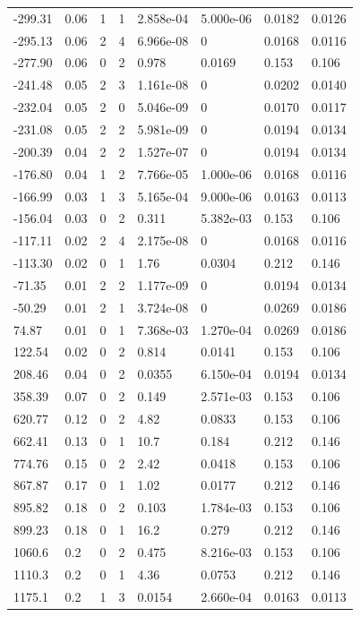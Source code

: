 \documentclass[preview]{standalone}
\begin{document}
{{\begin{tabular}{L{1.2cm}C{1.2cm} C{0.3cm}C{0.5cm} C{1.4cm}C{1.4cm} C{1.4cm}C{1.4cm}}
  -299.31  &  0.06  & 1     &  1 &  2.858e-04  & 5.000e-06  & 0.0182 &  0.0126   \\ 
  -295.13  &  0.06  & 2     &  4 &  6.966e-08  & 0  & 0.0168 &  0.0116   \\ 
  -277.90  &  0.06  & 0     &  2 &  0.978  & 0.0169  & 0.153 &  0.106   \\ 
  -241.48  &  0.05  & 2     &  3 &  1.161e-08  & 0  & 0.0202 &  0.0140   \\ 
  -232.04  &  0.05  & 2     &  0 &  5.046e-09  & 0  & 0.0170 &  0.0117   \\ 
  -231.08  &  0.05  & 2     &  2 &  5.981e-09  & 0  & 0.0194 &  0.0134   \\ 
  -200.39  &  0.04  & 2     &  2 &  1.527e-07  & 0  & 0.0194 &  0.0134   \\ 
  -176.80  &  0.04  & 1     &  2 &  7.766e-05  & 1.000e-06  & 0.0168 &  0.0116   \\ 
  -166.99  &  0.03  & 1     &  3 &  5.165e-04  & 9.000e-06  & 0.0163 &  0.0113   \\ 
  -156.04  &  0.03  & 0     &  2 &  0.311  & 5.382e-03  & 0.153 &  0.106   \\ 
  -117.11  &  0.02  & 2     &  4 &  2.175e-08  & 0  & 0.0168 &  0.0116   \\ 
  -113.30  &  0.02  & 0     &  1 &  1.76  & 0.0304  & 0.212 &  0.146   \\ 
  -71.35  &  0.01  & 2     &  2 &  1.177e-09  & 0  & 0.0194 &  0.0134   \\ 
  -50.29  &  0.01  & 2     &  1 &  3.724e-08  & 0  & 0.0269 &  0.0186   \\ 
  74.87  &  0.01  & 0     &  1 &  7.368e-03  & 1.270e-04  & 0.0269 &  0.0186   \\ 
  122.54  &  0.02  & 0     &  2 &  0.814  & 0.0141  & 0.153 &  0.106   \\ 
  208.46  &  0.04  & 0     &  2 &  0.0355  & 6.150e-04  & 0.0194 &  0.0134   \\ 
  358.39  &  0.07  & 0     &  2 &  0.149  & 2.571e-03  & 0.153 &  0.106   \\ 
  620.77  &  0.12  & 0     &  2 &  4.82  & 0.0833  & 0.153 &  0.106   \\ 
  662.41  &  0.13  & 0     &  1 &  10.7  & 0.184  & 0.212 &  0.146   \\ 
  774.76  &  0.15  & 0     &  2 &  2.42  & 0.0418  & 0.153 &  0.106   \\ 
  867.87  &  0.17  & 0     &  1 &  1.02  & 0.0177  & 0.212 &  0.146   \\ 
  895.82  &  0.18  & 0     &  2 &  0.103  & 1.784e-03  & 0.153 &  0.106   \\ 
  899.23  &  0.18  & 0     &  1 &  16.2  & 0.279  & 0.212 &  0.146   \\ 
  1060.6  &   0.2  & 0     &  2 &  0.475  & 8.216e-03  & 0.153 &  0.106   \\ 
  1110.3  &   0.2  & 0     &  1 &  4.36  & 0.0753  & 0.212 &  0.146   \\ 
  1175.1  &   0.2  & 1     &  3 &  0.0154  & 2.660e-04  & 0.0163 &  0.0113   \\ 
\hline 
\end{tabular} 

}}
\end{document}
